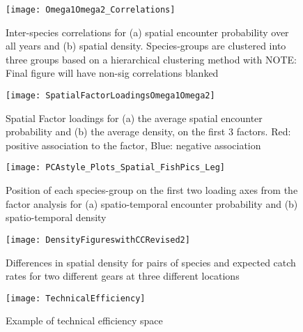 \documentclass{article}
\begin{document}
\begin{figure}
\begin{center}
	\texttt{[image: Omega1Omega2\_Correlations]}
	\label{fig:1}
	\caption{Inter-species correlations for (a) spatial encounter
		probability over all years and (b) spatial density.
		Species-groups are clustered into three groups based on a
		hierarchical clustering method with NOTE: Final figure will
		have non-sig correlations blanked}
\end{center}
\end{figure}

\begin{figure}
\begin{center}
	\texttt{[image: SpatialFactorLoadingsOmega1Omega2]}
	\label{fig:2}
	\caption{Spatial Factor loadings for (a) the average spatial encounter
		probability and (b) the average density,  on the first 3
		factors. Red: positive association to the factor, Blue:
		negative association}
\end{center}
\end{figure}

\begin{figure}
\begin{center}
	\texttt{[image: PCAstyle\_Plots\_Spatial\_FishPics\_Leg]}
	\label{fig:3}
	\caption{Position of each species-group on the first two loading axes from the
	factor analysis for (a) spatio-temporal encounter probability and (b)
	spatio-temporal density}
\end{center}
\end{figure}


\begin{figure}
\begin{center}
	\texttt{[image: DensityFigureswithCCRevised2]}
	\label{fig:4}
	\caption{Differences in spatial density for pairs of species and
		expected catch rates for two different gears at three different
	locations}
\end{center}
\end{figure}

\begin{figure}
\begin{center}
	\texttt{[image: TechnicalEfficiency]}
	\label{fig:5}
	\caption{Example of technical efficiency space}
\end{center}
\end{figure}
\end{document}
